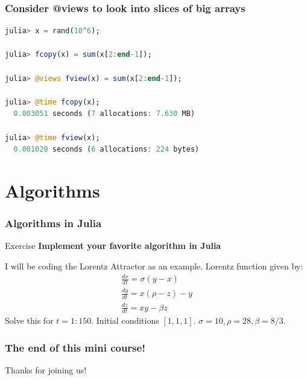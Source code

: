 \documentclass{beamer}
\begin{document}
\begin{frame}[fragile]
\frametitle{Consider @views to look into slices of big arrays}
\begin{lstlisting}[language=julia]
julia> x = rand(10^6);

julia> fcopy(x) = sum(x[2:end-1]);

julia> @views fview(x) = sum(x[2:end-1]);

julia> @time fcopy(x);
  0.003051 seconds (7 allocations: 7.630 MB)

julia> @time fview(x);
  0.001020 seconds (6 allocations: 224 bytes)
\end{lstlisting}
\end{frame}


\section{Algorithms}

\begin{frame}
\frametitle{Algorithms in Julia}
\begin{block}{Exercise}
\textbf{Implement your favorite algorithm in Julia}
\end{block}

I will be coding the Lorentz Attractor as an example.
Lorentz function given by:
\begin{gather*} 
   \frac{dx}{dt} = \sigma (y - x) \\
   \frac{dy}{dt} = x (\rho - z) - y \\
   \frac{dz}{dt} = xy - \beta z
\end{gather*} 
Solve this for $t=1:150$. Initial conditions $[1,1,1]$. $\sigma = 10, \rho = 28, \beta = 8/3$.
\end{frame}

\begin{frame}
\frametitle{The end of this mini course!}

\Huge{Thanks for joining us!}

\end{frame}
\end{document}
